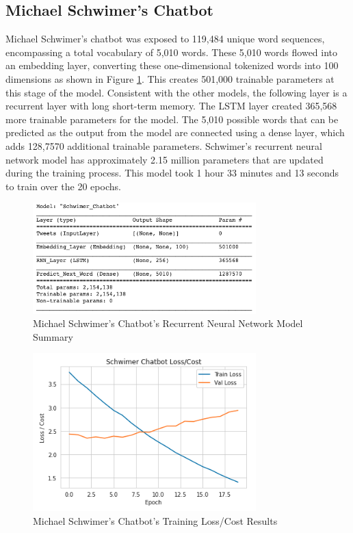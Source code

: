 \documentclass[5p,authoryear]{elsarticle}
\begin{document}
\subsection{Michael Schwimer’s Chatbot}


Michael Schwimer’s chatbot was exposed to 119,484 unique word sequences, encompassing a total vocabulary of 5,010 words. These 5,010 words flowed into an embedding layer, converting these one-dimensional tokenized words into 100 dimensions as shown in Figure \ref{Swim Summary}. This creates 501,000 trainable parameters at this stage of the model. Consistent with the other models, the following layer is a recurrent layer with long short-term memory. The LSTM layer created 365,568 more trainable parameters for the model. The 5,010 possible words that can be predicted as the output from the model are connected using a dense layer, which adds 128,7570 additional trainable parameters. Schwimer’s recurrent neural network model has approximately 2.15 million parameters that are updated during the training process. This model took 1 hour 33 minutes and 13 seconds to train over the 20 epochs.


\begin{figure}[!h] 
    \centering
	\includegraphics[width=3.4in]{figures/Swim_Model.png}
	\caption[]{Michael Schwimer’s Chatbot’s Recurrent Neural Network Model Summary} 
	\label{Swim Summary} 
\end{figure}


\begin{figure}[!htb] \centering
	\includegraphics[width=3.4in]{figures/Swim_Loss.png}
	\caption[]{Michael Schwimer’s Chatbot’s Training Loss/Cost Results} 
	\label{Swim Loss} 
\end{figure}
\end{document}
